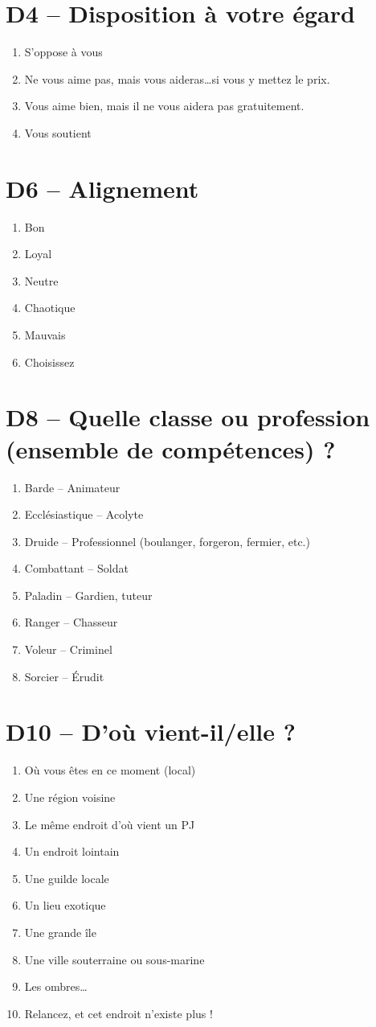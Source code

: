 \documentclass{article}
\begin{document}
\begin{multicols}{2}
	\section*{D4 -- Disposition à votre égard}
	\begin{enumerate}
		\item S'oppose à vous
		\item Ne vous aime pas, mais vous aideras\ldots si vous y mettez le prix.
		\item Vous aime bien, mais il ne vous aidera pas gratuitement.
		\item Vous soutient
	\end{enumerate}
	\section*{D6 -- Alignement}
	\begin{enumerate}
		\item Bon
		\item Loyal
		\item Neutre
		\item Chaotique
		\item Mauvais
		\item Choisissez
	\end{enumerate}
	\section*{D8 -- Quelle classe ou profession (ensemble de compétences) ?}
	\begin{enumerate}
		\item Barde -- Animateur
		\item Ecclésiastique -- Acolyte
		\item Druide -- Professionnel (boulanger, forgeron, fermier, etc.)
		\item Combattant -- Soldat
		\item Paladin -- Gardien, tuteur
		\item Ranger -- Chasseur
		\item Voleur -- Criminel
		\item Sorcier -- Érudit
	\end{enumerate}
	\section*{D10 -- D'où vient-il/elle ?}
	\begin{enumerate}
		\item Où vous êtes en ce moment (local)
		\item Une région voisine
		\item Le même endroit d'où vient un PJ
		\item Un endroit lointain
		\item Une guilde locale
		\item Un lieu exotique
		\item Une grande île
		\item Une ville souterraine ou sous-marine
		\item Les ombres\ldots
		\item Relancez, et cet endroit n'existe plus !
	\end{enumerate}

\end{multicols}
\end{document}

